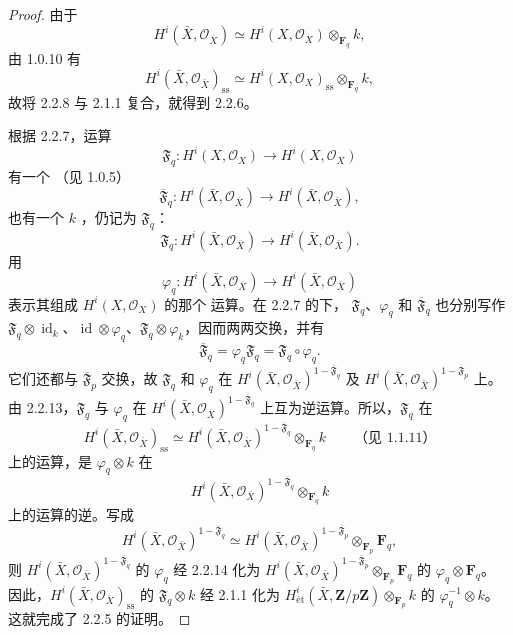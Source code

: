 \begin{proof}
由于
\[
H^i(\bar X,\mathcal O_{\bar X})\simeq
H^i(X,\mathcal O_X)\otimes_{\mathbf F_q}k, \tag{2.2.7}
\]
由 1.0.10 有
\[
H^i(\bar X,\mathcal O_{\bar X})_{\mathrm{ss}}\simeq
H^i(X,\mathcal O_X)_{\mathrm{ss}}\otimes_{\mathbf F_q}k, \tag{2.2.8}
\]
故将 2.2.8 与 2.1.1 复合，就得到 2.2.6。

根据 2.2.7，运算
\[
\mathfrak F_q:H^i(X,\mathcal O_X)\longrightarrow H^i(X,\mathcal O_X) \tag{2.2.9}
\]
有一个 （见 1.0.5）
\[
\overline{\mathfrak F}_q:H^i(\bar X,\mathcal O_{\bar X})
\longrightarrow H^i(\bar X,\mathcal O_{\bar X}), \tag{2.2.10}
\]
也有一个 $k$ ，仍记为 $\mathfrak F_q$：
\[
\mathfrak F_q:H^i(\bar X,\mathcal O_{\bar X})
\longrightarrow H^i(\bar X,\mathcal O_{\bar X}). \tag{2.2.11}
\]
用
\[
\varphi_q:H^i(\bar X,\mathcal O_{\bar X})
\longrightarrow H^i(\bar X,\mathcal O_{\bar X}) \tag{2.2.12}
\]
表示其组成 $H^i(X,\mathcal O_X)$ 的那个 运算。在 2.2.7 的下， $\mathfrak F_q$、$\varphi_q$ 和 $\overline{\mathfrak F}_q$ 也分别写作
$\mathfrak F_q\otimes\operatorname{id}_k$、$\operatorname{id}\otimes\varphi_q$、$\mathfrak F_q\otimes\varphi_k$，因而两两交换，并有
\[
\overline{\mathfrak F}_q=\varphi_q\mathfrak F_q
=\mathfrak F_q\circ\varphi_q. \tag{2.2.13}
\]
它们还都与 $\overline{\mathfrak F}_p$ 交换，故 $\mathfrak F_q$ 和 $\varphi_q$ 在
$H^i(\bar X,\mathcal O_{\bar X})^{1-\overline{\mathfrak F}_q}$
及 $H^i(\bar X,\mathcal O_{\bar X})^{1-\overline{\mathfrak F}_p}$ 上。由 2.2.13，$\mathfrak F_q$ 与 $\varphi_q$ 在
$H^i(\bar X,\mathcal O_{\bar X})^{1-\overline{\mathfrak F}_q}$ 上互为逆运算。所以，$\mathfrak F_q$ 在
\[
H^i(\bar X,\mathcal O_{\bar X})_{\mathrm{ss}}
\simeq H^i(\bar X,\mathcal O_{\bar X})^{1-\overline{\mathfrak F}_q}
\otimes_{\mathbf F_q}k
\qquad\text{（见 1.1.11）}
\]
上的运算，是 $\varphi_q\otimes k$ 在
\[
H^i(\bar X,\mathcal O_{\bar X})^{1-\overline{\mathfrak F}_q}
\otimes_{\mathbf F_q}k
\]
上的运算的逆。写成
\[
H^i(\bar X,\mathcal O_{\bar X})^{1-\overline{\mathfrak F}_q}
\simeq H^i(\bar X,\mathcal O_{\bar X})^{1-\overline{\mathfrak F}_p}
\otimes_{\mathbf F_p}\mathbf F_q, \tag{2.2.14}
\]
则 $H^i(\bar X,\mathcal O_{\bar X})^{1-\overline{\mathfrak F}_q}$ 的 $\varphi_q$ 经 2.2.14 化为
$H^i(\bar X,\mathcal O_{\bar X})^{1-\overline{\mathfrak F}_p}\otimes_{\mathbf F_p}\mathbf F_q$ 的 $\varphi_q\otimes\mathbf F_q$。
因此，$H^i(\bar X,\mathcal O_{\bar X})_{\mathrm{ss}}$ 的 $\mathfrak F_q\otimes k$ 经 2.1.1 化为
$H^i_{\text{ét}}(\bar X,\mathbf Z/p\mathbf Z)\otimes_{\mathbf F_p}k$ 的 $\varphi_q^{-1}\otimes k$。这就完成了 2.2.5 的证明。
\end{proof}

